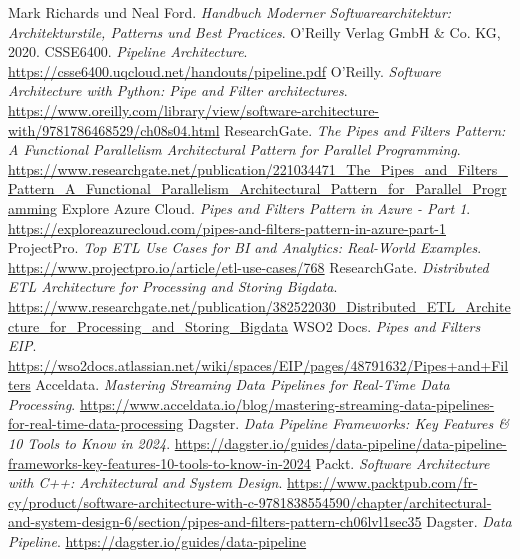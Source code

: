 \documentclass[10pt,a4paper]{article}
\begin{document}
\newpage
\begin{thebibliography}{99}
 Mark Richards und Neal Ford. \textit{Handbuch Moderner Softwarearchitektur: Architekturstile, Patterns und Best Practices}. O'Reilly Verlag GmbH & Co. KG, 2020.
 CSSE6400. \textit{Pipeline Architecture}. \url{https://csse6400.uqcloud.net/handouts/pipeline.pdf}
 O'Reilly. \textit{Software Architecture with Python: Pipe and Filter architectures}. \url{https://www.oreilly.com/library/view/software-architecture-with/9781786468529/ch08s04.html}
 ResearchGate. \textit{The Pipes and Filters Pattern: A Functional Parallelism Architectural Pattern for Parallel Programming}. \url{https://www.researchgate.net/publication/221034471_The_Pipes_and_Filters_Pattern_A_Functional_Parallelism_Architectural_Pattern_for_Parallel_Programming}
 Explore Azure Cloud. \textit{Pipes and Filters Pattern in Azure - Part 1}. \url{https://exploreazurecloud.com/pipes-and-filters-pattern-in-azure-part-1}
 ProjectPro. \textit{Top ETL Use Cases for BI and Analytics: Real-World Examples}. \url{https://www.projectpro.io/article/etl-use-cases/768}
 ResearchGate. \textit{Distributed ETL Architecture for Processing and Storing Bigdata}. \url{https://www.researchgate.net/publication/382522030_Distributed_ETL_Architecture_for_Processing_and_Storing_Bigdata}
 WSO2 Docs. \textit{Pipes and Filters EIP}. \url{https://wso2docs.atlassian.net/wiki/spaces/EIP/pages/48791632/Pipes+and+Filters}
 Acceldata. \textit{Mastering Streaming Data Pipelines for Real-Time Data Processing}. \url{https://www.acceldata.io/blog/mastering-streaming-data-pipelines-for-real-time-data-processing}
 Dagster. \textit{Data Pipeline Frameworks: Key Features & 10 Tools to Know in 2024}. \url{https://dagster.io/guides/data-pipeline/data-pipeline-frameworks-key-features-10-tools-to-know-in-2024}
 Packt. \textit{Software Architecture with C++: Architectural and System Design}. \url{https://www.packtpub.com/fr-cy/product/software-architecture-with-c-9781838554590/chapter/architectural-and-system-design-6/section/pipes-and-filters-pattern-ch06lvl1sec35}
 Dagster. \textit{Data Pipeline}. \url{https://dagster.io/guides/data-pipeline}
\end{thebibliography}
\end{document}

